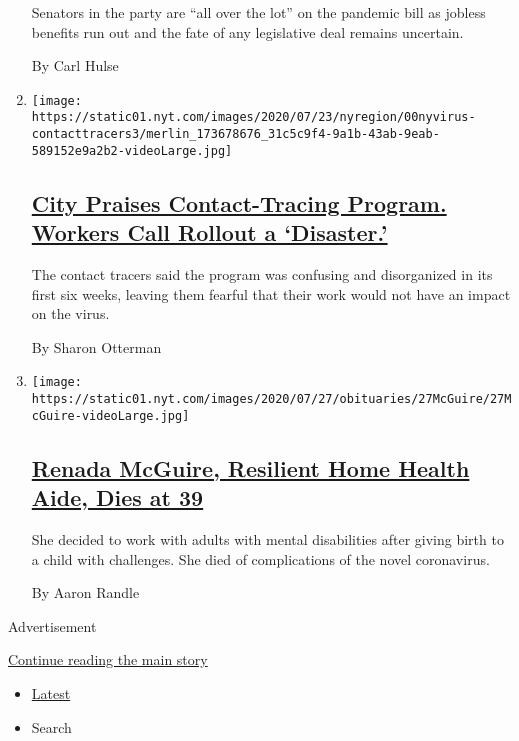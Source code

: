 \begin{enumerate}
  Senators in the party are ``all over the lot'' on the pandemic bill as
  jobless benefits run out and the fate of any legislative deal remains
  uncertain.

  By Carl Hulse
\item
  \texttt{[image: https://static01.nyt.com/images/2020/07/23/nyregion/00nyvirus-contacttracers3/merlin\_173678676\_31c5c9f4-9a1b-43ab-9eab-589152e9a2b2-videoLarge.jpg]}

  \hypertarget{city-praises-contact-tracing-program-workers-call-rollout-a-disaster}{%
  \subsection{\texorpdfstring{\href{/2020/07/29/nyregion/new-york-contact-tracing.html}{City
  Praises Contact-Tracing Program. Workers Call Rollout a
  `Disaster.'}}{City Praises Contact-Tracing Program. Workers Call Rollout a `Disaster.'}}\label{city-praises-contact-tracing-program-workers-call-rollout-a-disaster}}

  The contact tracers said the program was confusing and disorganized in
  its first six weeks, leaving them fearful that their work would not
  have an impact on the virus.

  By Sharon Otterman
\item
  \texttt{[image: https://static01.nyt.com/images/2020/07/27/obituaries/27McGuire/27McGuire-videoLarge.jpg]}

  \hypertarget{renada-mcguire-resilient-home-health-aide-dies-at-39}{%
  \subsection{\texorpdfstring{\href{/2020/07/29/obituaries/renada-mcguire-dead-coronavirus.html}{Renada
  McGuire, Resilient Home Health Aide, Dies at
  39}}{Renada McGuire, Resilient Home Health Aide, Dies at 39}}\label{renada-mcguire-resilient-home-health-aide-dies-at-39}}

  She decided to work with adults with mental disabilities after giving
  birth to a child with challenges. She died of complications of the
  novel coronavirus.

  By Aaron Randle
\end{enumerate}

Advertisement

\protect\hyperlink{after-mid2}{Continue reading the main story}

\begin{itemize}
\tightlist
\item
  \protect\hyperlink{stream-panel}{Latest}
\item
  Search
\end{itemize}

